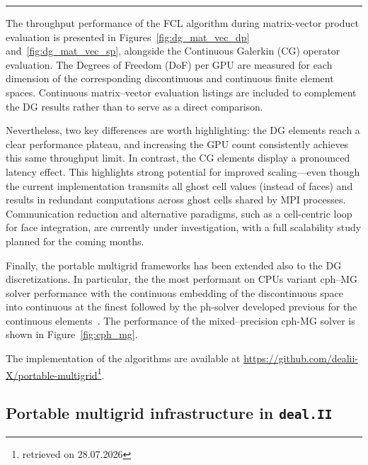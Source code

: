 \documentclass[a4paper,12pt]{article}
\begin{document}
\vspace{-0.5em}
\noindent\rule{\textwidth}{1pt}



The throughput performance of the FCL algorithm during matrix-vector product evaluation is presented in Figures~\ref{fig:dg_mat_vec_dp} and~\ref{fig:dg_mat_vec_sp}, alongside the Continuous Galerkin (CG) operator evaluation. The Degrees of Freedom (DoF) per GPU are measured for each dimension of the corresponding discontinuous and continuous finite element spaces. Continuous matrix–vector evaluation listings are included to complement the DG results rather than to serve as a direct comparison.

Nevertheless, two key differences are worth highlighting: the DG elements reach a clear performance plateau, and increasing the GPU count consistently achieves this same throughput limit. In contrast, the CG elements display a pronounced latency effect. This highlights strong potential for improved scaling—even though the current implementation transmits all ghost cell values (instead of faces) and results in redundant computations across ghost cells shared by MPI processes. Communication reduction and alternative paradigms, such as a cell-centric loop for face integration, are currently under investigation, with a full scalability study planned for the coming months.



Finally, the portable multigrid frameworks has been extended also to the DG discretizations. In particular, the the most performant on CPUs variant cph--MG solver performance with the continuous embedding of the discontinuous space into continuous at the finest followed by the ph-solver developed previous for the continuous elements~\cite{Fehn2020}. The performance of the mixed--precision cph-MG solver is shown in Figure~\ref{fig:cph_mg}.

The implementation of the algorithms are available at \url{https://github.com/dealii-X/portable-multigrid}\footnote{retrieved on 28.07.2026}.

\subsection{Portable multigrid infrastructure in \texttt{deal.II}}
\end{document}
